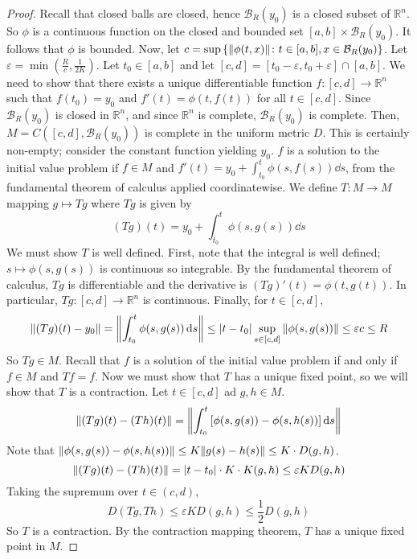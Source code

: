 \begin{proof}
	Recall that closed balls are closed, hence \( \mathcal B_R(y_0) \) is a closed subset of \( \mathbb R^n \).
	So \( \phi \) is a continuous function on the closed and bounded set \( [a,b] \times \mathcal B_R(y_0) \).
	It follows that \( \phi \) is bounded.
	Now, let \( c = \sup \qty{ \norm{\phi(t,x)} \colon t \in [a,b], x \in \mathcal B_R(y_0) } \).
	Let \( \varepsilon = \min(\frac{R}{c}, \frac{1}{2K}) \).
	Let \( t_0 \in [a,b] \) and let \( [c,d] = [t_0 - \varepsilon, t_0 + \varepsilon] \cap [a,b] \).
	We need to show that there exists a unique differentiable function \( f \colon [c,d] \to \mathbb R^n \) such that \( f(t_0) = y_0 \) and \( f'(t) = \phi(t,f(t)) \) for all \( t \in [c,d] \).
	Since \( \mathcal B_R(y_0) \) is closed in \( \mathbb R^n \), and since \( \mathbb R^n \) is complete, \( \mathcal B_R(y_0) \) is complete.
	Then, \( M = C([c,d], \mathcal B_R(y_0)) \) is complete in the uniform metric \( D \).
	This is certainly non-empty; consider the constant function yielding \( y_0 \).
	\( f \) is a solution to the initial value problem if \( f \in M \) and \( f'(t) = y_0 + \int_{t_0}^t \phi(s, f(s)) \dd{s} \), from the fundamental theorem of calculus applied coordinatewise.
	We define \( T \colon M \to M \) mapping \( g \mapsto Tg \) where \( Tg \) is given by
	\[
		(Tg)(t) = y_0 + \int_{t_0}^t \phi(s, g(s)) \dd{s}
	\]
	We must show \( T \) is well defined.
	First, note that the integral is well defined; \( s \mapsto \phi(s,g(s)) \) is continuous so integrable.
	By the fundamental theorem of calculus, \( Tg \) is differentiable and the derivative is \( (Tg)'(t) = \phi(t,g(t)) \).
	In particular, \( Tg \colon [c,d] \to \mathbb R^n \) is continuous.
	Finally, for \( t \in [c,d] \),
	\[
		\norm{(Tg)(t) - y_0} = \norm{\int_{t_0}^t \phi(s, g(s)) \dd{s}} \leq \abs{t - t_0} \sup_{s \in [c,d]} \norm{\phi(s,g(s))} \leq \varepsilon c \leq R
	\]
	So \( Tg \in M \).
	Recall that \( f \) is a solution of the initial value problem if and only if \( f \in M \) and \( Tf = f \).
	Now we must show that \( T \) has a unique fixed point, so we will show that \( T \) is a contraction.
	Let \( t \in [c,d] \) ad \( g,h \in M \).
	\[
		\norm{(Tg)(t) - (Th)(t)} = \norm{\int_{t_0}^t \qty[ \phi(s,g(s)) - \phi(s,h(s)) ] \dd{s}}
	\]
	Note that \( \norm{\phi(s,g(s)) - \phi(s,h(s))} \leq K \norm{g(s) - h(s)} \leq K \cdot D(g,h) \).
	\[
		\norm{(Tg)(t) - (Th)(t)} = \abs{t-t_0} \cdot K \cdot K(g,h) \leq \varepsilon K D(g,h)
	\]
	Taking the supremum over \( t \in (c,d) \),
	\[
		D(Tg, Th) \leq \varepsilon K D(g,h) \leq \frac{1}{2} D(g,h)
	\]
	So \( T \) is a contraction.
	By the contraction mapping theorem, \( T \) has a unique fixed point in \( M \).
\end{proof}
